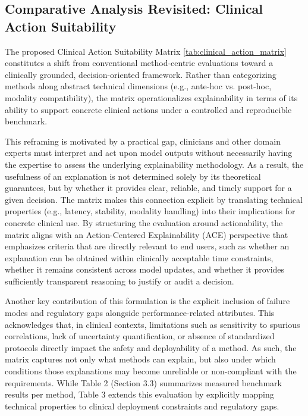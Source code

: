 \documentclass[pdflatex,sn-mathphys-num]{sn-jnl}%
\theoremstyle{thmstyleone}%
\theoremstyle{thmstyletwo}%
\theoremstyle{thmstylethree}%
\begin{document}
\begin{itemize}
\subsection{Comparative Analysis Revisited: Clinical Action Suitability}
The proposed Clinical Action Suitability Matrix \ref{tab:clinical_action_matrix} constitutes a shift from conventional method-centric evaluations toward a clinically grounded, decision-oriented framework. Rather than categorizing methods along abstract technical dimensions (e.g., ante-hoc vs. post-hoc, modality compatibility), the matrix operationalizes explainability in terms of its ability to support concrete clinical actions under a controlled and reproducible benchmark. 

This reframing is motivated by a practical gap, clinicians and other domain experts must interpret and act upon model outputs without necessarily having the expertise to assess the underlying explainability methodology. 
As a result, the usefulness of an explanation is not determined solely by its theoretical guarantees, but by whether it provides clear, reliable, and timely support for a given decision. The matrix makes this connection explicit by translating technical properties (e.g., latency, stability, modality handling) into their implications for concrete clinical use.
By structuring the evaluation around actionability, the matrix aligns with an Action-Centered Explainability (ACE) perspective that emphasizes criteria that are directly relevant to end users, such as whether an explanation can be obtained within clinically acceptable time constraints, whether it remains consistent across model updates, and whether it provides sufficiently transparent reasoning to justify or audit a decision.

Another key contribution of this formulation is the explicit inclusion of failure modes and regulatory gaps alongside performance-related attributes. This acknowledges that, in clinical contexts, limitations such as sensitivity to spurious correlations, lack of uncertainty quantification, or absence of standardized protocols directly impact the safety and deployability of a method. As such, the matrix captures not only what methods can explain, but also under which conditions those explanations may become unreliable or non-compliant with the requirements.
While Table 2 (Section 3.3) summarizes measured benchmark results per method, Table 3 extends this evaluation by explicitly mapping technical properties to clinical deployment constraints and regulatory gaps.


\end{itemize}
\end{document}

